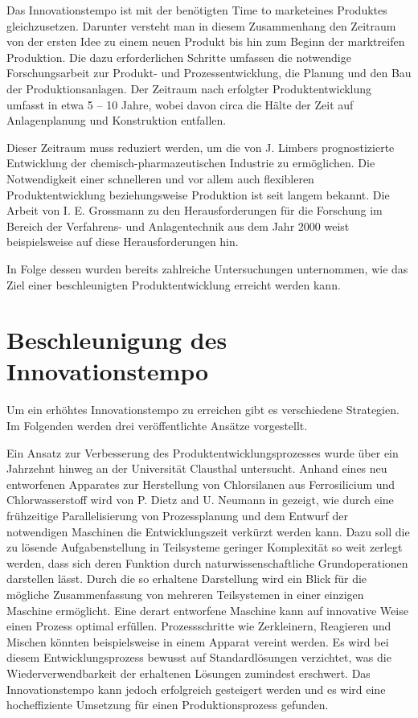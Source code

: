 Das Innovationstempo ist mit der ben\"otigten \glqq Time to market\grqq { }eines Produktes gleichzusetzen. Darunter versteht man in diesem Zusammenhang den Zeitraum von der ersten Idee zu einem neuen Produkt bis hin zum Beginn der marktreifen Produktion. Die dazu erforderlichen Schritte umfassen die notwendige Forschungsarbeit zur Produkt- und Prozessentwicklung, die Planung und den Bau der Produktionsanlagen. Der Zeitraum nach erfolgter Produktentwicklung umfasst in etwa 5 -- 10 Jahre, wobei davon circa die H\"alte der Zeit auf Anlagenplanung und Konstruktion entfallen. \cite{Schembecker_2009}

Dieser Zeitraum muss reduziert werden, um die von J. Limbers prognostizierte Entwicklung der chemisch-pharmazeutischen Industrie zu erm\"oglichen. Die Notwendigkeit einer schnelleren und vor allem auch flexibleren Produktentwicklung beziehungsweise Produktion ist seit langem bekannt. Die Arbeit von I. E. Grossmann zu den Herausforderungen f\"ur die Forschung im Bereich der Verfahrens- und Anlagentechnik aus dem Jahr 2000 weist beispielsweise auf diese Herausforderungen hin. \cite{Grossmann_2000} \hfill \newline

In Folge dessen wurden bereits zahlreiche Untersuchungen unternommen, wie das Ziel einer beschleunigten Produktentwicklung erreicht werden kann. 

\section{Beschleunigung des Innovationstempo}
Um ein erh\"ohtes Innovationstempo zu erreichen gibt es verschiedene Strategien. Im Folgenden werden drei ver\"offentlichte Ans\"atze vorgestellt.\hfill \newline

Ein Ansatz zur Verbesserung des Produktentwicklungsprozesses wurde \"uber ein Jahrzehnt hinweg an der Universit\"at Clausthal untersucht. Anhand eines neu entworfenen Apparates zur Herstellung von Chlorsilanen aus Ferrosilicium und Chlorwasserstoff wird von P. Dietz and U.  Neumann in \cite{Dietz_2000} gezeigt, wie durch eine fr\"uhzeitige Parallelisierung von Prozessplanung und dem Entwurf der notwendigen Maschinen die Entwicklungszeit verk\"urzt werden kann. Dazu soll die zu l\"osende Aufgabenstellung in Teilsysteme geringer Komplexit\"at so weit zerlegt werden, dass sich deren Funktion durch naturwissenschaftliche Grundoperationen darstellen l\"asst. Durch die so erhaltene Darstellung wird ein Blick f\"ur die m\"ogliche Zusammenfassung von mehreren Teilsystemen in einer einzigen Maschine erm\"oglicht. Eine derart entworfene Maschine kann auf innovative Weise einen Prozess optimal erf\"ullen. Prozessschritte wie Zerkleinern, Reagieren und Mischen k\"onnten beispielsweise in einem Apparat vereint werden. Es wird bei diesem Entwicklungsprozess bewusst auf Standardl\"osungen verzichtet, was die Wiederverwendbarkeit der erhaltenen L\"osungen zumindest erschwert. Das Innovationstempo kann jedoch erfolgreich gesteigert werden und es wird eine hocheffiziente Umsetzung f\"ur einen  Produktionsprozess gefunden.  \hfill \newline

